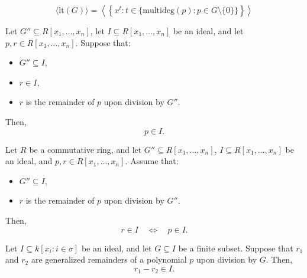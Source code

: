         \begin{lemma}\label{leadingTerm_ideal_span_monomial'}
          \leanok
          \[
\langle \mathrm{lt}(G) \rangle = \left\langle \left\{ x^t : t \in \{ \mathrm{multideg}(p) : p \in G \setminus \{0\} \} \right\} \right\rangle
\]

        \end{lemma}

        \begin{lemma}\label{mem_ideal_of_remainder_mem_ideal}
          \leanok
          Let \( G'' \subseteq R[x_1, \dots, x_n] \), let \( I \subseteq R[x_1, \dots, x_n] \) be an ideal,
and let \( p, r \in R[x_1, \dots, x_n] \). Suppose that:
\begin{itemize}
  \item \( G'' \subseteq I \),
  \item \( r \in I \),
  \item \( r \) is the remainder of \( p \) upon division by \( G'' \).
\end{itemize}
Then,
\[
p \in I.
\]

        \end{lemma}

        \begin{lemma}\label{remainder_mem_ideal_iff}
          \leanok
          Let \( R \) be a commutative ring, and let \( G'' \subseteq R[x_1, \dots, x_n] \), \( I \subseteq R[x_1, \dots, x_n] \) be an ideal, and \( p, r \in R[x_1, \dots, x_n] \).
Assume that:
\begin{itemize}
  \item \( G'' \subseteq I \),
  \item \( r \) is the remainder of \( p \) upon division by \( G'' \).
\end{itemize}
Then,
\[
r \in I \quad \Longleftrightarrow \quad p \in I.
\]

        \end{lemma}

        \begin{lemma}\label{remainder_sub_remainder_mem_ideal}
          \leanok
          Let \( I \subseteq k[x_i : i \in \sigma] \) be an ideal, and let \( G \subseteq I \) be a finite subset.
Suppose that \( r_1 \) and \( r_2 \) are generalized remainders of a polynomial \( p \) upon division by \( G \).
Then,
\[
r_1 - r_2 \in I.
\]

        \end{lemma}

